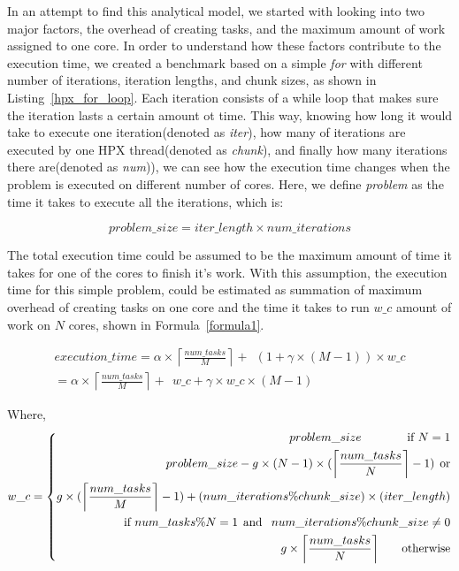 In an attempt to find this analytical model, we started with looking into two major factors, the overhead of creating tasks, and the maximum amount of work assigned to one core. 
In order to understand how these factors contribute to the execution time, we created a benchmark based on a simple \textit{for} with different number of iterations, iteration lengths, and chunk sizes, as shown in Listing~\ref{hpx_for_loop}. 
Each iteration consists of a while loop that makes sure the iteration lasts a certain amount ot time. This way, knowing how long it would take to execute one iteration(denoted as \textit{iter}), how many of iterations are executed by one HPX thread(denoted as \textit{chunk}), and finally how many iterations there are(denoted as \textit{num})), we can see how the execution time changes when the problem is executed on different number of cores. Here, we define \textit{problem} as the time it takes to execute all the iterations, which is:

\begin{equation}\label{problem_size}
problem\_size = iter\_length\times{num\_iterations}
\end{equation}

The total execution time could be assumed to be the maximum amount of time it takes for one of the cores to finish it's work. With this assumption, the execution time for this simple problem, could be estimated as summation of maximum overhead of creating tasks on one core and the time it takes to run $w\_c$ amount of work on $N$ cores, shown in Formula~\ref{formula1}.

\begin{equation}\label{formula1}
\begin{aligned}
execution\_time = \alpha\times\left \lceil{\frac{num\_{tasks}}{M}}\right \rceil +\:\:{(1+\gamma\times{(M-1)})\times{w\_c}}\\
=\alpha\times\left \lceil{\frac{num\_{tasks}}{M}}\right \rceil +\:\:{w\_c+\gamma\times{w\_c}\times{(M-1)}}
\end{aligned}
\end{equation}

Where, 
\begin{equation}\label{formula2}
w\_c =\left\{
\begin{aligned}
problem\_{size} \:\:\:\:\:\:\:\:\:\:\:\:\:\:\:\:        \text{ if } N=1\\
problem\_{size}-g\times{(N-1)}\times(\left \lceil{\frac{num\_{tasks}}{N}}\right \rceil-1) \text{\:\:or} \\
g\times(\left \lceil{\frac{num\_{tasks}}{M}}\right \rceil-1)+(num\_{iterations}\%chunk\_{size})\times(iter\_{length}) \\ \:\:\:\:\:\:\:\:       \text{if }num\_{tasks}\%N=1\text{\:\:and\:\: }num\_{iterations}\%chunk\_{size}\neq0\\
g\times\left \lceil{\frac{num\_{tasks}}{N}}\right \rceil  \:\:\:\:\:\:\:\:       \text{otherwise}
\end{aligned}
\right.
\end{equation}


